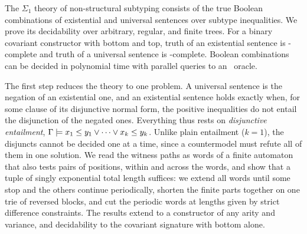 The $\Sigma_1$ theory of non-structural subtyping consists of the true Boolean combinations
of existential and universal sentences over subtype inequalities. We prove its
decidability over arbitrary, regular, and finite trees. For a binary covariant constructor
with bottom and top, truth of an existential sentence is \NExp-complete and truth of a
universal sentence is \coNExp-complete. Boolean combinations can be decided in polynomial
time with parallel queries to an \NExp\ oracle.

The first step reduces the theory to one problem. A universal sentence is the negation of an
existential one, and an existential sentence holds exactly when, for some clause of its
disjunctive normal form, the positive inequalities do not entail the disjunction of the
negated ones. Everything thus rests on \emph{disjunctive entailment},
$\Gamma\models x_1\le y_1\lor\cdots\lor x_k\le y_k$. Unlike plain entailment ($k=1$), the
disjuncts cannot be decided one at a time, since a countermodel must refute all of them in
one solution. We read the witness paths as words of a finite automaton that also tests pairs
of positions, within and across the words, and show that a tuple of singly exponential total
length suffices: we extend all words until some stop and the others continue periodically,
shorten the finite parts together on one trie of reversed blocks, and cut the periodic words
at lengths given by strict difference constraints. The results extend to a constructor of
any arity and variance, and decidability to the covariant signature with bottom alone.

